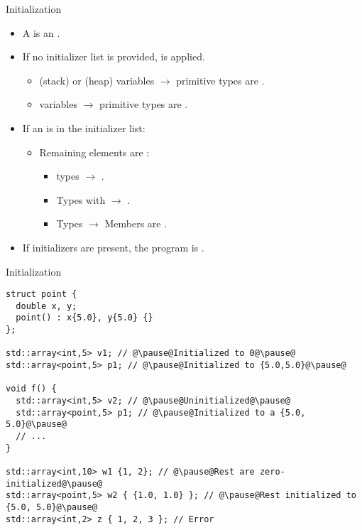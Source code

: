 \begin{frame}[t,fragile]{Initialization}
  \begin{itemize}
    \item A  is an .
    
    \item If no initializer list is provided,  is applied.
      \begin{itemize}
        \item {} (stack) or  (heap) variables 
              $\rightarrow$ 
              primitive types are .
        \item {} variables
              $\rightarrow$ 
              primitive types are .
      \end{itemize}

    \item If an  is in the initializer list:
      \begin{itemize}
        \item Remaining elements are :
        \begin{itemize}
          \item {} types
              $\rightarrow$ 
              .
          \item Types with    
              $\rightarrow$ 
              .
          \item Types 
              $\rightarrow$
              Members are .
        \end{itemize}
      \end{itemize}

    \item If  initializers are present,
          the program is .
  \end{itemize}
\end{frame}

\begin{frame}[t,fragile]{Initialization}
\begin{lstlisting}[escapechar=@]
struct point {
  double x, y;
  point() : x{5.0}, y{5.0} {}
};

std::array<int,5> v1; // @\pause@Initialized to 0@\pause@
std::array<point,5> p1; // @\pause@Initialized to {5.0,5.0}@\pause@

void f() {
  std::array<int,5> v2; // @\pause@Uninitialized@\pause@
  std::array<point,5> p1; // @\pause@Initialized to a {5.0, 5.0}@\pause@
  // ...
}

std::array<int,10> w1 {1, 2}; // @\pause@Rest are zero-initialized@\pause@
std::array<point,5> w2 { {1.0, 1.0} }; // @\pause@Rest initialized to {5.0, 5.0}@\pause@
std::array<int,2> z { 1, 2, 3 }; // Error
\end{lstlisting}
\end{frame}

